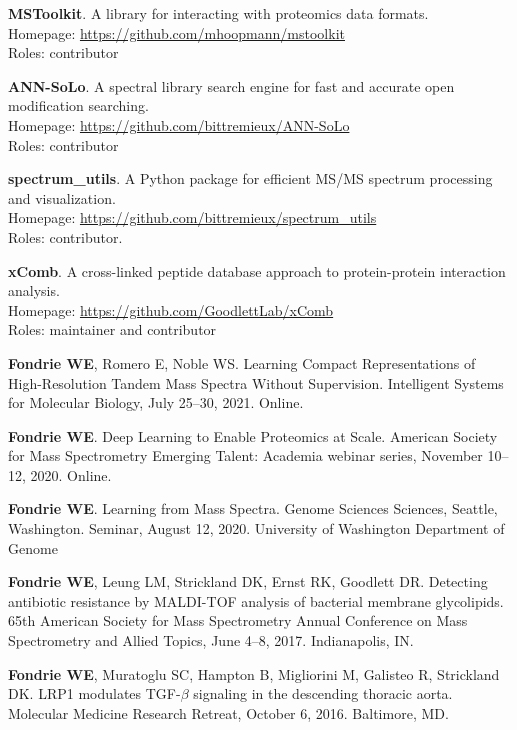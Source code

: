 \documentclass[11pt]{article}
\newcommand{\mysection}[1]{\vspace{1ex \textbf{\large \textrm{#1}} \quad
    \hrulefill}}
\newcommand{\myref}[1]{\href{#1}{\url{#1}}}
\begin{document}
\begin{etaremune}
  \item \textbf{MSToolkit}. A library for interacting with proteomics data formats. \\
  Homepage: \myref{https://github.com/mhoopmann/mstoolkit} \\
  Roles: contributor

  \item \textbf{ANN-SoLo}. A spectral library search engine for fast and
  accurate open modification searching. \\
  Homepage: \myref{https://github.com/bittremieux/ANN-SoLo} \\
  Roles: contributor
   
  \item \textbf{spectrum\_utils}. A Python package for efficient MS/MS spectrum
  processing and visualization. \\
  Homepage: \myref{https://github.com/bittremieux/spectrum_utils} \\
  Roles: contributor.

  \item \textbf{xComb}. A cross-linked peptide database approach to
  protein-protein interaction analysis. \\
  Homepage: \myref{https://github.com/GoodlettLab/xComb} \\
  Roles: maintainer and contributor

\end{etaremune}

\mysection{Talks}
\begin{etaremune}
  \item \textbf{Fondrie WE}, Romero E, Noble WS. Learning Compact
  Representations of High-Resolution Tandem Mass Spectra Without Supervision.
  Intelligent Systems for Molecular Biology, July 25--30, 2021. Online.

  \item \textbf{Fondrie WE}. Deep Learning to Enable Proteomics at Scale.
  American Society for Mass Spectrometry Emerging Talent: Academia webinar
  series, November 10--12, 2020. Online.
  
  \item \textbf{Fondrie WE}. Learning from Mass Spectra. Genome Sciences
  Sciences, Seattle, Washington. Seminar, August 12, 2020. University of
  Washington Department of Genome
  
  \item \textbf{Fondrie WE}, Leung LM, Strickland DK, Ernst RK, Goodlett DR.
  Detecting antibiotic resistance by MALDI-TOF analysis of bacterial membrane
  glycolipids. 65th American Society for Mass Spectrometry Annual Conference on
  Mass Spectrometry and Allied Topics, June 4--8, 2017. Indianapolis, IN.
    
  \item \textbf{Fondrie WE}, Muratoglu SC, Hampton B, Migliorini M, Galisteo R,
  Strickland DK. LRP1 modulates TGF-$\beta$ signaling in the descending
  thoracic aorta. Molecular Medicine Research Retreat, October 6, 2016.
  Baltimore, MD.
\end{etaremune}
\end{document}
